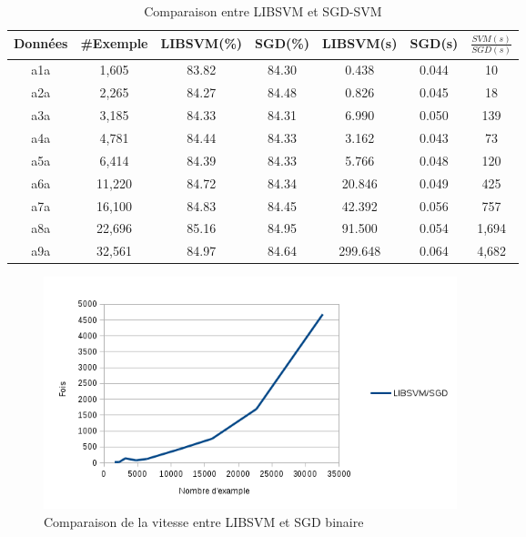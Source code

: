 \begin{table}
\begin{center}
    \begin{tabular}{ | c | c | c | c | c | c | c |}
    \hline
    Données & \#Exemple & LIBSVM(\%) & SGD(\%) & LIBSVM(s) & SGD(s) & $\frac{SVM(s)}{SGD(s)}$ \\ \hline
    
    a1a & 1,605 & 83.82 & 84.30 & 0.438 & 0.044 & 10 \\ \hline
    
    a2a & 2,265 & 84.27 & 84.48 & 0.826 & 0.045 & 18 \\ \hline
    
    a3a & 3,185 & 84.33 & 84.31 & 6.990 & 0.050 & 139 \\ \hline
    
    a4a & 4,781 & 84.44 & 84.33 & 3.162 & 0.043 & 73 \\ \hline
    
    a5a & 6,414 & 84.39 & 84.33 & 5.766 & 0.048 & 120 \\ \hline
    
    a6a & 11,220 & 84.72 & 84.34 & 20.846 & 0.049 & 425 \\ \hline
    
    a7a & 16,100 & 84.83 & 84.45 & 42.392 & 0.056 & 757 \\ \hline
    
    a8a & 22,696 & 85.16 & 84.95 & 91.500 & 0.054 & 1,694 \\ \hline
    
    a9a & 32,561 & 84.97 & 84.64 & 299.648 & 0.064 & 4,682 \\ \hline
    
    \end{tabular}
\end{center}
\caption{Comparaison entre LIBSVM et SGD-SVM}
\label{tab:svmsgd}
\end{table}

\begin{figure}[ht!]
\centering
\includegraphics[width=120mm]{images/res}
\caption{Comparaison de la vitesse entre LIBSVM et SGD binaire}
\label{fig:res}
\end{figure}

